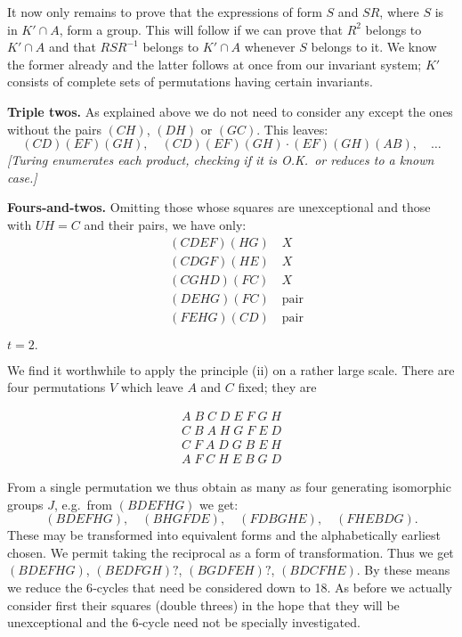 \documentclass[12pt]{article}
\begin{document}
\medskip

It now only remains to prove that the expressions of form $S$ and $SR$, where $S$ is in $K' \cap A$, form a group. This will follow if we can prove that $R^2$ belongs to $K' \cap A$ and that $RSR^{-1}$ belongs to $K' \cap A$ whenever $S$ belongs to it. We know the former already and the latter follows at once from our invariant system; $K'$ consists of complete sets of permutations having certain invariants.

\medskip

\noindent
{\bf Triple twos.} As explained above we do not need to consider any except the ones without the pairs $(CH)$, $(DH)$ or $(GC)$. This leaves:
\[
(CD)(EF)(GH),\quad
(CD)(EF)(GH)\cdot(EF)(GH)(AB),\quad
\ldots
\]
{\em [Turing enumerates each product, checking if it is O.K.\ or reduces to a known case.]}

\medskip

\noindent
{\bf Fours‐and‐twos.} Omitting those whose squares are unexceptional and those with $U H = C$ and their pairs, we have only:
\[
\begin{aligned}
&(CDEF)(HG)\quad X\\
&(CDGF)(HE)\quad X\\
&(CGHD)(FC)\quad X\\
&(DEHG)(FC)\quad \text{pair}\\
&(FEHG)(CD)\quad \text{pair}
\end{aligned}
\]

\medskip

\noindent
$t = 2.$

\smallskip

We find it worthwhile to apply the principle (ii) on a rather large scale. There are four permutations $V$ which leave $A$ and $C$ fixed; they are

\[
\begin{aligned}
A\;B\;C\;D\;E\;F\;G\;H \\
C\;B\;A\;H\;G\;F\;E\;D \\
C\;F\;A\;D\;G\;B\;E\;H \\
A\;F\;C\;H\;E\;B\;G\;D
\end{aligned}
\]

From a single permutation we thus obtain as many as four generating isomorphic groups $J$, e.g.\ from $(BDEFHG)$ we get:
\[
(BDEFHG),\quad(BHGFDE),\quad(FDBGHE),\quad(FHEBDG).
\]
These may be transformed into equivalent forms and the alphabetically earliest chosen. We permit taking the reciprocal as a form of transformation. Thus we get $(BDEFHG)$, $(BEDFGH)?$, $(BGDFEH)?$, $(BDC FHE)$. By these means we reduce the 6‐cycles that need be considered down to 18. As before we actually consider first their squares (double threes) in the hope that they will be unexceptional and the 6‐cycle need not be specially investigated.
\end{document}

